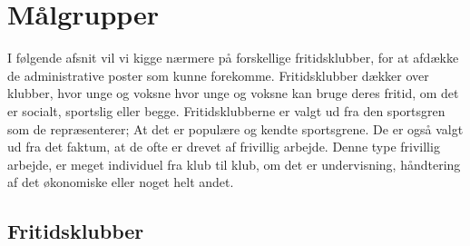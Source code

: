 \chapter{Målgrupper}

I følgende afsnit vil vi kigge nærmere på forskellige fritidsklubber, for at afdække de administrative poster som kunne forekomme. Fritidsklubber dækker over klubber, hvor unge og voksne hvor unge og voksne kan bruge deres fritid, om det er socialt, sportslig eller begge. Fritidsklubberne er valgt ud fra den sportsgren som de repræsenterer; At det er populære og kendte sportsgrene. De er også valgt ud fra det faktum, at de ofte er drevet af frivillig arbejde. Denne type frivillig arbejde, er meget individuel fra klub til klub, om det er undervisning, håndtering af det økonomiske eller noget helt andet. 


\section{Fritidsklubber} \label{Fritidsklub}



